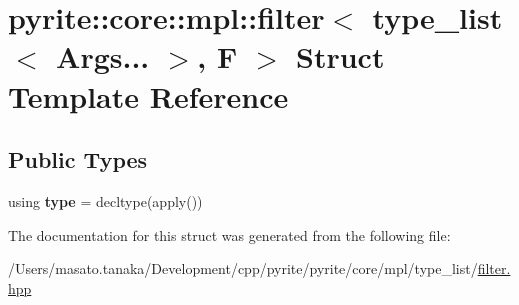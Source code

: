 \hypertarget{structpyrite_1_1core_1_1mpl_1_1filter_3_01type__list_3_01_args_8_8_8_01_4_00_01_f_01_4}{}\section{pyrite\+:\+:core\+:\+:mpl\+:\+:filter$<$ type\+\_\+list$<$ Args... $>$, F $>$ Struct Template Reference}
\label{structpyrite_1_1core_1_1mpl_1_1filter_3_01type__list_3_01_args_8_8_8_01_4_00_01_f_01_4}
\subsection*{Public Types}
\begin{DoxyCompactItemize}
\item 
\mbox{\label{structpyrite_1_1core_1_1mpl_1_1filter_3_01type__list_3_01_args_8_8_8_01_4_00_01_f_01_4_adeba210487d17d017f01d39027f9c1a4}} 
using {\bfseries type} = decltype(apply())
\end{DoxyCompactItemize}


The documentation for this struct was generated from the following file\+:\begin{DoxyCompactItemize}
\item 
/\+Users/masato.\+tanaka/\+Development/cpp/pyrite/pyrite/core/mpl/type\+\_\+list/\mbox{\hyperlink{core_2mpl_2type__list_2filter_8hpp}{filter.\+hpp}}\end{DoxyCompactItemize}
